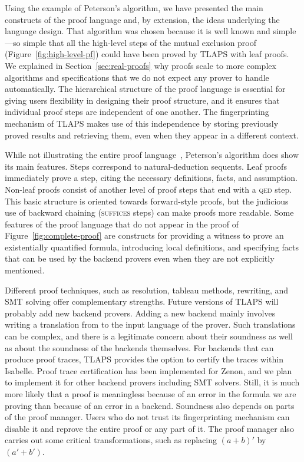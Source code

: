 \documentclass[a4paper,draft]{llncs}
\renewcommand{\QED}{\textsc{qed }}
\begin{document}
Using the example of Peterson's algorithm, we have presented the main constructs
of the \tlaplus proof language and, by extension, the ideas underlying the
language design.
That algorithm was chosen because it is well known and simple---so simple that
all the high-level steps of the mutual exclusion proof
(Figure~\ref{fig:high-level-pf}) could have been proved by TLAPS with leaf
proofs. We explained in Section~\ref{sec:real-proofs} why \tlaplus proofs scale
to more complex algorithms and specifications that we do not expect any prover to
handle automatically.
% 
The hierarchical structure of the proof language is essential for giving users
flexibility in designing their proof structure, and it ensures that individual
proof steps are independent of one another. The fingerprinting mechanism of
TLAPS makes use of this independence by storing previously proved results and
retrieving them, even when they appear in a different context.

While not illustrating  the entire proof language~\cite{lamport:tla+2},
Peterson's algorithm does show its main features. Steps correspond to
natural-deduction sequents.
Leaf proofs immediately prove a step, citing the necessary
definitions, facts, and assumption. Non-leaf proofs consist of another level of
proof steps that end with a \QED step.
This basic structure is oriented towards forward-style
proofs, but the judicious use of backward chaining (\textsc{suffices} steps)
can make proofs more readable. Some features of the proof language
that do not appear in the proof of Figure~\ref{fig:complete-proof} are constructs
for providing a witness to prove an existentially quantified formula,
introducing local definitions, and specifying facts that can be used by the
backend provers even when they are not explicitly mentioned.

Different proof techniques, such as resolution, tableau methods,
rewriting, and SMT solving offer complementary strengths.
Future versions of TLAPS will probably add new backend provers.
Adding a new backend mainly involves writing a translation from
\tlaplus to the input language of the prover.  Such
translations can be complex, and there is a legitimate concern about
their soundness as well as about the soundness of the backends
themselves.  For backends that can produce proof traces, TLAPS
provides the option to certify the traces within Isabelle.
Proof trace certification has been implemented for Zenon,
and we plan to implement it for other backend provers including SMT
solvers.  Still, it is much more likely that a proof is meaningless
because of an error in the formula we are proving than because of
an error in a backend.  Soundness also depends on 
parts of the proof manager.
Users who do not trust its fingerprinting mechanism can
disable it and reprove the entire proof or any part of it.
The proof manager also carries out some critical transformations, such
as replacing $(a+b)'$ by $(a'+b')$.
\end{document}
